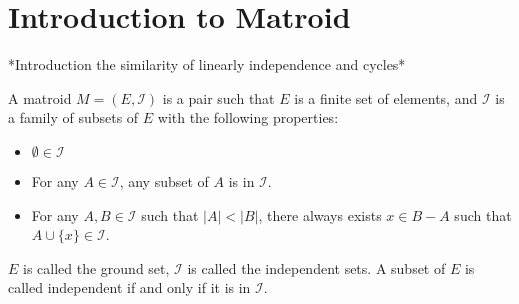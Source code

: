 \section{Introduction to Matroid}

*Introduction the similarity of linearly independence and cycles*

\begin{defn}
A matroid $M = (E, \mathcal{I})$ is a pair such that $E$ is a finite set of elements, and $\mathcal{I}$ is a family of subsets of $E$ with the following properties:
\begin{itemize}
\item $\emptyset \in \mathcal{I}$
\item For any $A\in \mathcal{I}$, any subset of $A$ is in $\mathcal{I}$.
\item For any $A, B \in \mathcal{I}$ such that $\lvert A \rvert < \lvert B \rvert$, there always exists $x \in B - A$ such that $A \cup \{ x \} \in \mathcal{I}$.
\end{itemize}
$E$ is called the ground set, $\mathcal{I}$ is called the independent sets. A subset of $E$ is called independent if and only if it is in $\mathcal{I}$.
\end{defn}

